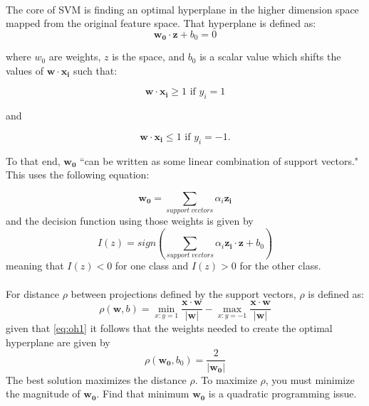 			\paragraph{} The core of SVM is finding an optimal hyperplane in the higher dimension space mapped from the original feature space.  That hyperplane is defined as:
			\begin{equation}\label{eq:oh1} \mathbf{w_0} \cdot \mathbf{z} + b_0 = 0\end{equation} 
			
			where $w_0$ are weights, $z$ is the space, and $b_0$ is a scalar value which shifts the values of $\mathbf{w\cdot x_i}$ such that:
			
			\begin{equation} \label{eq:b-not_one} \mathbf{w\cdot x_i} \ge 1 \text{ if }y_i = 1 \end{equation}
			
			and
			
			\begin{equation} \label{eq:b-not_two} \mathbf{w\cdot x_i} \le 1 \text{ if }y_i = -1 .\end{equation}
			
			To that end, $\mathbf{w_0}$ ``can be written as some linear combination of support vectors."  This uses the following equation:
			
			\begin{equation}\mathbf{w_0} = \sum_{support\ vectors} \alpha_i \mathbf{z_i}\end{equation} and the decision function using those weights is given by
			\begin{equation}I(z) = sign\left(\sum_{support\ vectors} \alpha_i \mathbf{z_i} \cdot \mathbf{z} + b_0\right)\end{equation}
			meaning that $I(z) < 0$ for one class and $I(z) > 0$ for the other class.
			\paragraph{}
			For distance $\rho$ between projections defined by the support vectors, $\rho$ is defined as:
			\begin{equation}\rho(\mathbf{w}, b) = \min_{x:y=1} \frac{\mathbf{x} \cdot \mathbf{w}}{ |\mathbf{w}|} - \max_{x:y=-1} \frac{\mathbf{x} \cdot \mathbf{w}}{|\mathbf{w}|}\end{equation}
			given that \ref{eq:oh1} it follows that the weights needed to create the optimal hyperplane are given by
			\begin{equation} \rho (\mathbf{w_0}, b_0) = \frac{2}{|\mathbf{w_0}|}\end{equation}  The best solution maximizes the distance $\rho$.  To maximize $\rho$, you must minimize the magnitude of $\mathbf{w_0}$.  Find that minimum $\mathbf{w_0}$ is a quadratic programming issue.\cite{vapnik_support-vector_1995}

